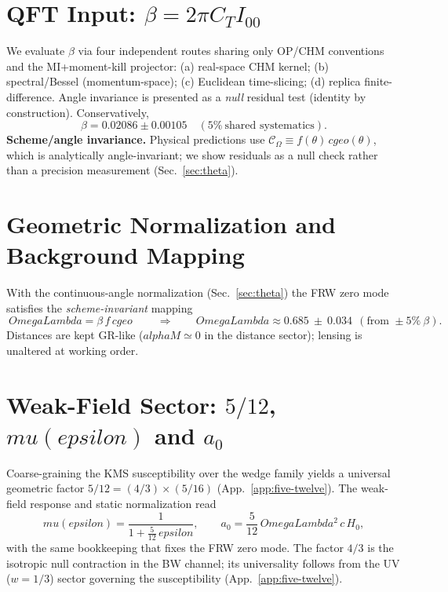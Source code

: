 \documentclass[aps,prd,onecolumn,superscriptaddress,nofootinbib]{revtex4-2}
\def\OmL{OmegaLambda}%
\def\cgeo{cgeo}%
\def\alphaM{alphaM}%
\def\eps{epsilon}%
\def\boxed#1{#1}%
\def\mu{mu}%
\def\alpha{alpha}%
\def\alpha_M{alphaM}%
\def\Omega_\Lambda{OmegaLambda}%
\providecommand{\OmL}{\Omega_\Lambda}
\providecommand{\cgeo}{c_{\rm geo}}
\providecommand{\alphaM}{\alpha_M}
\providecommand{\eps}{\varepsilon}
\begin{document}
\section{QFT Input: \texorpdfstring{$\beta=2\pi C_T I_{00}$}{beta}}
\label{sec:beta}
We evaluate \(\beta\) via four independent routes sharing only OP/CHM conventions and the MI+moment-kill projector: (a) real-space CHM kernel; (b) spectral/Bessel (momentum-space); (c) Euclidean time-slicing; (d) replica finite-difference. Angle invariance is presented as a \emph{null} residual test (identity by construction). Conservatively,
\begin{equation}
\beta = 0.02086 \pm 0.00105 \quad (5\%~\text{shared systematics}).
\end{equation}
\noindent\textbf{Scheme/angle invariance.} Physical predictions use \(\mathcal C_\Omega\equiv f(\theta)\, \cgeo(\theta)\), which is analytically angle-invariant; we show residuals as a null check rather than a precision measurement (Sec.~\ref{sec:theta}).

\section{Geometric Normalization and Background Mapping}
\label{sec:geom-map}
With the continuous-angle normalization (Sec.~\ref{sec:theta}) the FRW zero mode satisfies the \emph{scheme-invariant} mapping
\begin{equation}
\boxed{\ \OmL = \beta\, f\, \cgeo\ } \qquad \Rightarrow \qquad \OmL \approx 0.685 \ \pm\ 0.034\ \ (\text{from }\pm 5\%~\beta).
\end{equation}
Distances are kept GR-like (\(\alphaM\simeq 0\) in the distance sector); lensing is unaltered at working order.

\section{Weak-Field Sector: \texorpdfstring{$5/12$}{5/12}, \texorpdfstring{$\mu(\eps)$}{mu} and \texorpdfstring{$a_0$}{a0}}
\label{sec:weakfield}
Coarse-graining the KMS susceptibility over the wedge family yields a universal geometric factor \(5/12=(4/3)\times(5/16)\) (App.~\ref{app:five-twelve}). The weak-field response and static normalization read
\begin{equation}
\label{eq:mu-a0}
\mu(\eps)=\frac{1}{1+\tfrac{5}{12}\,\eps},\qquad
a_0=\frac{5}{12}\,\OmL^2\,c\,H_0,
\end{equation}
with the same bookkeeping that fixes the FRW zero mode. The factor \(4/3\) is the isotropic null contraction in the BW channel; its universality follows from the UV (\(w=1/3\)) sector governing the susceptibility (App.~\ref{app:five-twelve}).
\end{document}
